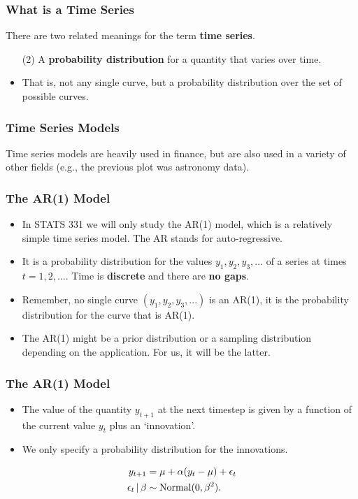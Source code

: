 \documentclass{beamer}
\newcommand{\given}{\,|\,}
\begin{document}
\begin{frame}
\frametitle{What is a Time Series}
There are two related meanings for the term {\bf time series}.

\begin{itemize}
\item [(2)] A {\bf probability distribution} for a quantity that varies over time.\pause
\item That is, not any single curve, but a probability distribution over the
set of possible curves.
\end{itemize}

\end{frame}


\begin{frame}
\frametitle{Time Series Models}
Time series models are heavily used in finance, but are also used in a 
variety of other fields (e.g., the previous plot was astronomy data).

\end{frame}

\begin{frame}
\frametitle{The AR(1) Model}

\begin{itemize}
\item In STATS 331 we will only study the AR(1) model, which is a relatively simple
time series model. The AR stands for auto-regressive.\pause
\item It is a probability distribution for the values $y_1, y_2, y_3, ...$
of a series at times $t=1, 2, ...$.
Time is {\bf discrete} and there are {\bf no gaps}.\pause
\item Remember, no single curve $(y_1, y_2, y_3, ...)$ is an AR(1), it is
the probability distribution for the curve that is AR(1).\pause
\item The AR(1) might be a prior distribution or a sampling distribution
depending on the application. For us, it will be the latter.
\end{itemize}
\end{frame}

\begin{frame}
\frametitle{The AR(1) Model}

\begin{itemize}
\item The value of the quantity $y_{t+1}$ at the next timestep is given by
a function of the current value $y_{t}$ plus an `innovation'.\pause
\item We only specify a probability distribution for the innovations.\pause
\end{itemize}
\begin{align}
y_{t+1} &= \mu + \alpha(y_t - \mu) + \epsilon_t \\
\epsilon_t \given \beta &\sim \textnormal{Normal}(0, \beta^2).
\end{align}

\end{frame}
\end{document}
